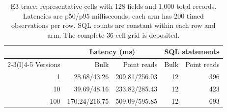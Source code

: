 \begin{table}[tb]
\centering
\small
\caption{E3 trace: representative cells with 128 fields and 1,000 total records. Latencies are p50/p95 milliseconds; each arm has 200 timed observations per row. SQL counts are constant within each row and arm. The complete 36-cell grid is deposited.}
\label{tab:dke-trace}
\begin{tabular}{@{}rrrrr@{}}
\toprule
 & \multicolumn{2}{c}{Latency (ms)} & \multicolumn{2}{c}{SQL statements} \\
\cmidrule(lr){2-3}\cmidrule(l){4-5}
Versions & Bulk & Point reads & Bulk & Point reads \\
\midrule
1 & 28.68/43.26 & 209.81/256.03 & 12 & 396 \\
10 & 39.69/48.16 & 233.82/285.43 & 12 & 423 \\
100 & 170.24/216.75 & 509.09/595.85 & 12 & 693 \\
\bottomrule
\end{tabular}
\end{table}
